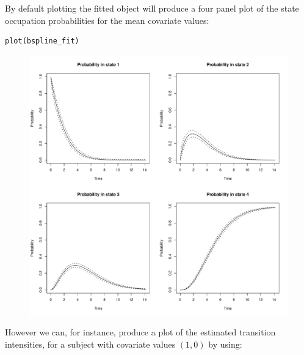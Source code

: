 \documentclass{article}
\numberwithin{equation}{section}
\begin{document}
By default plotting the fitted object will produce a four panel plot of the state occupation probabilities for the mean covariate values:

\begin{verbatim}
plot(bspline_fit)
\end{verbatim}

\begin{figure}[ht]
\begin{center}
\includegraphics[scale=0.3]{Figures/bspline_fit1.pdf}
\end{center}
\end{figure}

However we can, for instance, produce a plot of the estimated transition intensities, for a subject with covariate values $(1,0)$ by using:
\end{document}
